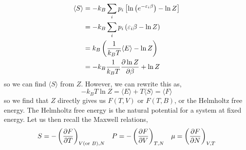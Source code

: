 \documentclass{book}
\begin{document}
\begin{equation}
	\begin{split}
	\langle S \rangle &= -k_B\sum_ip_i\left[\ln\left(e^{-\varepsilon_i\beta}\right)-\ln Z\right]\\
	& = -k_B \sum_ip_i\left(\varepsilon_i\beta - \ln Z\right) \\
	& = k_B \left(\frac{1}{k_B T}\langle E \rangle - \ln Z \right) \\
	& = -k_B\frac{1}{k_BT} \pdv{\ln Z}{\beta} + \ln Z
\end{split}
\end{equation}
so we can find $\langle S \rangle$ from $Z$. However, we can rewrite this as,
\begin{equation}
	-k_BT \ln Z = \langle E \rangle + T \langle S \rangle = \langle F \rangle \label{eq:F}
\end{equation}
so we find that $Z$ directly gives us $F(T,V)$ or $F(T,B)$, or the Helmholtz free energy. The Helmholtz free energy is the natural potential for a system at fixed energy. Let us then recall the Maxwell relations,
\begin{align}
	S = -\left(\pdv{F}{T}\right)_{V (\text{or } B), N} && P = -\left(\pdv{F}{V}\right)_{T, N} && \mu = \left(\pdv{F}{N}\right)_{V, T} \label{eq:maxwell}
\end{align}
\end{document}
